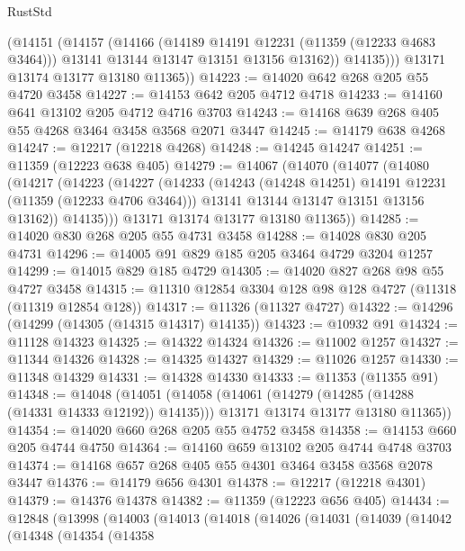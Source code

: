 \begin{lexlean}{RustStd}
\begin{coremodule}
{{{{{{{{{{{{{{{{{{{            (@14151
              (@14157
                (@14166
                  (@14189 @14191 @12231 (@11359 (@12233 @4683 @3464)))
                  @13141
                  @13144
                  @13147
                  @13151
                  @13156
                  @13162))
              @14135)))
        @13171
        @13174
        @13177
        @13180
        @11365))
@14223 := @14020 @642 @268 @205 @55 @4720 @3458
@14227 := @14153 @642 @205 @4712 @4718
@14233 := @14160 @641 @13102 @205 @4712 @4716 @3703
@14243 := @14168 @639 @268 @405 @55 @4268 @3464 @3458 @3568 @2071 @3447
@14245 := @14179 @638 @4268
@14247 := @12217 (@12218 @4268)
@14248 := @14245 @14247
@14251 := @11359 (@12223 @638 @405)
@14279 := @14067
    (@14070
      (@14077
        (@14080
          (@14217
            (@14223
              (@14227
                (@14233
                  (@14243 (@14248 @14251) @14191 @12231 (@11359 (@12233 @4706 @3464)))
                  @13141
                  @13144
                  @13147
                  @13151
                  @13156
                  @13162))
              @14135)))
        @13171
        @13174
        @13177
        @13180
        @11365))
@14285 := @14020 @830 @268 @205 @55 @4731 @3458
@14288 := @14028 @830 @205 @4731
@14296 := @14005 @91 @829 @185 @205 @3464 @4729 @3204 @1257
@14299 := @14015 @829 @185 @4729
@14305 := @14020 @827 @268 @98 @55 @4727 @3458
@14315 := @11310 @12854 @3304 @128 @98 @128 @4727 (@11318 (@11319 @12854 @128))
@14317 := @11326 (@11327 @4727)
@14322 := @14296 (@14299 (@14305 (@14315 @14317) @14135))
@14323 := @10932 @91
@14324 := @11128 @14323
@14325 := @14322 @14324
@14326 := @11002 @1257
@14327 := @11344 @14326
@14328 := @14325 @14327
@14329 := @11026 @1257
@14330 := @11348 @14329
@14331 := @14328 @14330
@14333 := @11353 (@11355 @91)
@14348 := @14048
    (@14051
      (@14058
        (@14061 (@14279 (@14285 (@14288 (@14331 @14333 @12192)) @14135)))
        @13171
        @13174
        @13177
        @13180
        @11365))
@14354 := @14020 @660 @268 @205 @55 @4752 @3458
@14358 := @14153 @660 @205 @4744 @4750
@14364 := @14160 @659 @13102 @205 @4744 @4748 @3703
@14374 := @14168 @657 @268 @405 @55 @4301 @3464 @3458 @3568 @2078 @3447
@14376 := @14179 @656 @4301
@14378 := @12217 (@12218 @4301)
@14379 := @14376 @14378
@14382 := @11359 (@12223 @656 @405)
@14434 := @12848
    (@13998
      (@14003
        (@14013
          (@14018
            (@14026
              (@14031
                (@14039
                  (@14042
                    (@14348
                      (@14354
                        (@14358
}}}}}}}}}}}}}}}}}}}
\end{coremodule}
\end{lexlean}
